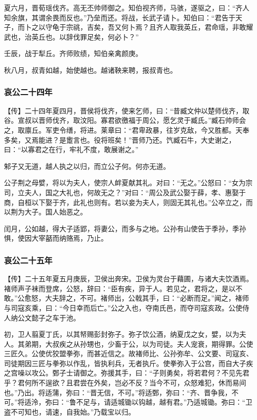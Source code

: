 \documentclass[]{article}
\begin{document}
夏六月，晋荀瑶伐齐。高无丕帅师御之。知伯视齐师，马骇，遂驱之，曰：``齐人知余旗，其谓余畏而反也。''乃垒而还。将战，长武子请卜。知伯曰：``君告于天子，而卜之以守龟于宗祧，吉矣，吾又何卜焉？且齐人取我英丘，君命瑶，非敢耀武也，治英丘也。以辞伐罪足矣，何必卜？''

壬辰，战于犁丘。齐师败绩，知伯亲禽颜庚。

秋八月，叔青如越，始使越也。越诸鞅来聘，报叔青也。

\hypertarget{header-n3278}{%
\subsubsection{哀公二十四年}\label{header-n3278}}

【传】二十四年夏四月，晋侯将伐齐，使来乞师，曰：``昔臧文仲以楚师伐齐，取谷。宣叔以晋师伐齐，取汶阳。寡君欲徼福于周公，愿乞灵于臧氏。''臧石帅师会之，取廪丘。军吏令缮，将进。莱章曰：``君卑政暴，往岁克敌，今又胜都。天奉多矣，又焉能进？是躗言也。役将班矣！''晋师乃还。饩臧石牛，大史谢之，曰：``以寡君之在行，牢礼不度，敢展谢之。''

邾子又无道，越人执之以归，而立公子何。何亦无道。

公子荆之母嬖，将以为夫人，使宗人衅夏献其礼。对曰：``无之。''公怒曰：``女为宗司，立夫人，国之大礼也，何故无之？''对曰：``周公及武公娶于薛，孝、惠娶于商，自桓以下娶于齐，此礼也则有。若以妾为夫人，则固无其礼也。''公卒立之，而以荆为大子。国人始恶之。

闰月，公如越，得大子适郢，将妻公，而多与之地。公孙有山使告于季孙，季孙惧，使因大宰嚭而纳赂焉，乃止。

\hypertarget{header-n3285}{%
\subsubsection{哀公二十五年}\label{header-n3285}}

【传】二十五年夏五月庚辰，卫侯出奔宋。卫侯为灵台于藉圃，与诸大夫饮酒焉。褚师声子袜而登席，公怒，辞曰：``臣有疾，异于人。若见之，君将之，是以不敢。''公愈怒，大夫辞之，不可。褚师出，公戟其手，曰：``必断而足。''闻之，褚师与司寇亥乘，曰：``今日幸而后亡。''公之入也，夺南氏邑，而夺司寇亥政。公使侍人纳公文懿子之车于池。

初，卫人翦夏丁氏，以其帑赐彭封弥子。弥子饮公酒，纳夏戊之女，嬖，以为夫人。其弟期，大叔疾之从孙甥也，少畜于公，以为司徒。夫人宠衰，期得罪。公使三匠久。公使优狡盟拳弥，而甚近信之。故褚师比、公孙弥牟、公文要、司寇亥、司徒期因三匠与拳弥以作乱，皆执利兵，无者执斤。使拳弥入于公宫，而自大子疾之宫噪以攻公。鄄子士请御之。弥援其手，曰：``子则勇矣，将若君何？不见先君乎？君何所不逞欲？且君尝在外矣，岂必不反？当今不可，众怒难犯，休而易间也。''乃出。将适蒲，弥曰：``晋无信，不可。''将适鄄，弥曰：``齐、晋争我，不可。''将适泠，弥曰：``鲁不足与，请适城锄以钩越，越有君。''乃适城锄。弥曰：``卫盗不可知也，请速，自我始。''乃载宝以归。
\end{document}
